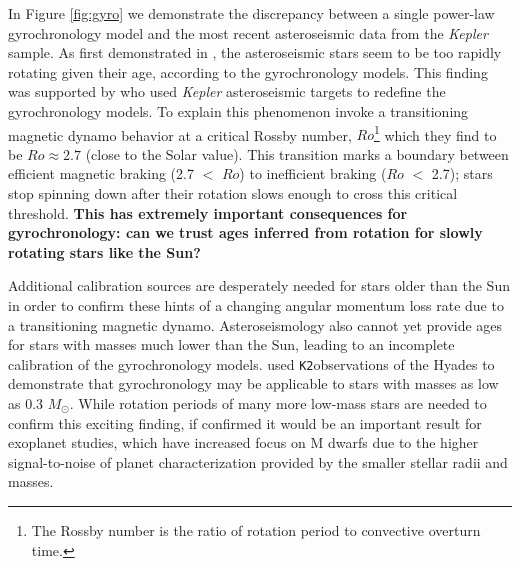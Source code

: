 \documentclass[12pt]{article}
\newcommand{\Kepler}{\textsl{Kepler}\xspace}
\newcommand{\ktwo}{{\tt K2}}
\begin{document}
In Figure \ref{fig:gyro} we demonstrate the discrepancy between a single
power-law gyrochronology model and the most recent asteroseismic data from
the \Kepler sample.
As first demonstrated in \citet{angus2015}, the asteroseismic stars seem to be
too rapidly rotating given their age, according to the gyrochronology models.
This finding was supported by \citet{van-saders2016} who used \Kepler
asteroseismic targets to redefine the gyrochronology models.
To explain this phenomenon \citet{van-saders2016} invoke a transitioning magnetic dynamo
behavior at a critical Rossby number, $Ro$\footnote{The Rossby number is the
ratio of rotation period to convective overturn time.} which they find to be
$Ro\approx2.7$ (close to the Solar value).
This transition marks a boundary between efficient magnetic braking (2.7 $<$
$Ro$) to inefficient braking ($Ro$ $<$ 2.7); stars stop spinning down after
their rotation slows enough to cross this critical threshold.
{\bf This has extremely important consequences for gyrochronology: can we trust
ages inferred from rotation for slowly rotating stars like the Sun?}

Additional calibration sources are desperately needed for stars older than the
Sun in order to confirm these hints of a changing angular momentum loss rate due to a transitioning magnetic dynamo.
Asteroseismology also cannot yet provide ages for stars with masses
much lower than the Sun, leading to an incomplete calibration of the gyrochronology models.
\citet{douglas2017} used \ktwo observations of the Hyades to demonstrate that
gyrochronology may be applicable to stars with masses as low as 0.3 $M_\odot$. While rotation periods of many more low-mass stars are needed to confirm this exciting finding, if confirmed it would be an important result for exoplanet studies,
which have increased focus on M dwarfs due to the higher signal-to-noise of planet characterization provided by the smaller stellar radii and masses.


\end{document}

